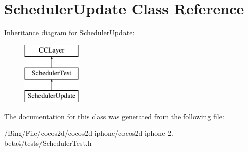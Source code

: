 \hypertarget{interface_scheduler_update}{\section{Scheduler\-Update Class Reference}
\label{interface_scheduler_update}
}
Inheritance diagram for Scheduler\-Update\-:\begin{figure}[H]
\begin{center}
\leavevmode
\includegraphics[height=3.000000cm]{interface_scheduler_update}
\end{center}
\end{figure}


The documentation for this class was generated from the following file\-:\begin{DoxyCompactItemize}
\item 
/\-Bing/\-File/cocos2d/cocos2d-\/iphone/cocos2d-\/iphone-\/2.-\/beta4/tests/Scheduler\-Test.\-h\end{DoxyCompactItemize}
